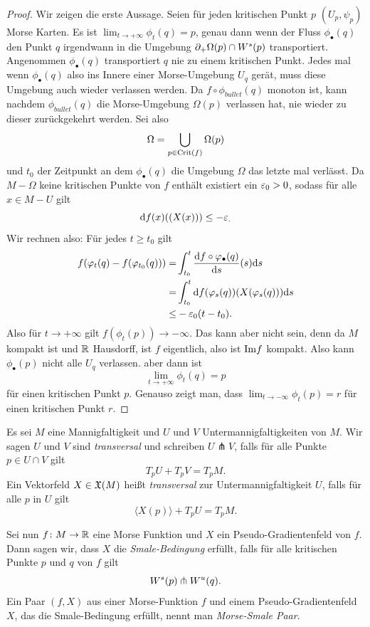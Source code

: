 \begin{proof}
    Wir zeigen die erste Aussage. Seien für jeden kritischen Punkt $p$ $(U_p, \psi_p)$ Morse Karten.
    Es ist $\lim_{t \to + \infty} \phi_t(q) = p$, genau dann wenn
    der Fluss $\phi_{\bullet}(q)$ den Punkt $q$ irgendwann in die Umgebung 
    ${ \partial }_+ \Omega (p) \cap { W^s }(p)$ transportiert. Angenommen $\phi_{\bullet}(q)$ transportiert
    $q$ nie zu einem kritischen Punkt. Jedes mal wenn $\phi_{\bullet}(q)$ also ins Innere einer
    Morse-Umgebung $U_q$ gerät, muss diese Umgebung auch wieder verlassen werden. Da 
    $f \circ \phi_{bullet}(q)$ monoton ist, kann nachdem $\phi_{bullet}(q)$ die Morse-Umgebung 
    $\Omega (p)$ verlassen hat, nie wieder zu dieser zurückgekehrt werden.
    Sei also 
    \[ \Omega = \bigcup_{p \in { \operatorname{Crit} }(f)} \Omega (p) \]
    und $t_0$ der Zeitpunkt an dem $\phi_{\bullet} (q)$ die Umgebung $\Omega$ das letzte mal verlässt.
    Da $M - \Omega$ keine kritischen Punkte von $f$ enthält existiert ein $\varepsilon_0 > 0$, sodass für 
    alle $x \in M - U$ gilt 
    \[ { \operatorname{d} } f (x) ((X(x))) \leq - \varepsilon_ . \]
    Wir rechnen also: Für jedes $t \geq t_0$ gilt
    \begin{align*}
        f(\varphi_t(q) - f(\varphi_{t_0}(q))) = & 
            \int_{t_0}^t \derive[f \circ \phi_{\bullet}(q)]{s} (s) \opd s \\
        = & \int_{t_0}^t \opd f (\phi_s(q)) (X(\phi_s(q))) \opd s \\
        \leq & - \eps_0 (t - t_0) . 
    \end{align*}
    Also für $t \to + \infty$ gilt $f(\phi_t(p)) \to - \infty$. Das kann aber nicht sein, denn da 
    $M$ kompakt ist und ${ \mathbb R }$ Hausdorff, ist $f$ eigentlich, also ist ${ \operatorname{Im} } f$ kompakt. 
     Also kann $\phi_{\bullet}(p)$ 
    nicht alle $U_q$ verlassen. aber dann ist 
    \[ \lim_{t \to + \infty} \phi_t(q) = p \]
    für einen kritischen Punkt $p$.
    Genauso zeigt man, dass $\lim_{t \to - \infty} \phi_t(p) = r$ für einen kritischen Punkt $r$.
\end{proof}

\begin{definition}
    \label{def: smale-bedingung}
    Es sei $M$ eine Mannigfaltigkeit und $U$ und $V$ Untermannigfaltigkeiten von $M$. Wir sagen 
    $U$ und $V$ sind \textit{transversal} und schreiben $U \pitchfork V$, falls für alle Punkte 
    $p \in U \cap V$ gilt 
    \[ T_pU + T_pV = T_pM . \]
    Ein Vektorfeld $X \in { \mathfrak{X} } (M)$ heißt \textit{transversal} zur Untermannigfaltigkeit $U$, falls 
    für alle $p$ in $U$ gilt 
    \[ \langle X(p) \rangle + T_pU = T_pM . \]

    Sei nun $f \colon M \to { \mathbb R }$ eine Morse Funktion und $X$ ein Pseudo-Gradientenfeld von $f$. Dann sagen
    wir, dass $X$ die \textit{Smale-Bedingung} erfüllt, falls für alle kritischen Punkte $p$ und $q$ von 
    $f$ gilt 
    \[ { W^s } (p) \pitchfork { W^u } (q) . \]
    Ein Paar $(f, X)$ aus einer Morse-Funktion $f$ und einem Pseudo-Gradientenfeld $X$, das die 
    Smale-Bedingung erfüllt, nennt man \textit{Morse-Smale Paar}.
\end{definition}

